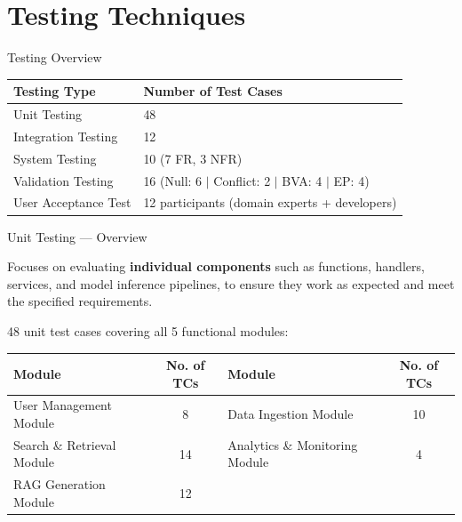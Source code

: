 \documentclass[aspectratio=169,xcolor=dvipsnames]{beamer}
\begin{document}
\section{Testing Techniques}

\begin{frame}{Testing Overview}
  \begin{table}
    \centering\renewcommand{\arraystretch}{1.4}
    \begin{tabular}{p{}|p{}}
      \toprule
      \textbf{Testing Type} & \textbf{Number of Test Cases}\\
      \midrule
      Unit Testing        & 48 \\
      \midrule
      Integration Testing & 12 \\
      \midrule
      System Testing      & 10 \quad (7 FR, 3 NFR) \\
      \midrule
      Validation Testing  & 16 \quad
        \scriptsize(Null: 6 $\mid$ Conflict: 2 $\mid$ BVA: 4 $\mid$ EP: 4) \\
      \midrule
      User Acceptance Test & 12 participants (domain experts + developers) \\
      \bottomrule
    \end{tabular}
  \end{table}
\end{frame}

\begin{frame}{Unit Testing — Overview}
  \begin{block}{}
    Focuses on evaluating \textbf{individual components} such as
    functions, handlers, services, and model inference pipelines,
    to ensure they work as expected and meet the specified requirements.
  \end{block}
  \vspace{.4em}
  \small 48 unit test cases covering all 5 functional modules:
  \vspace{.3em}
  \begin{table}
    \centering\renewcommand{\arraystretch}{1.1}
    \begin{tabular}{p{}|c||p{}|c}
      \toprule
      \textbf{Module} & \textbf{No. of TCs} & \textbf{Module} & \textbf{No. of TCs}\\
      \midrule
      User Management Module     & 8  & Data Ingestion Module          & 10 \\
      Search \& Retrieval Module  & 14 & Analytics \& Monitoring Module & 4  \\
      RAG Generation Module      & 12 & & \\
      \bottomrule
    \end{tabular}
  \end{table}
\end{frame}
\end{document}
